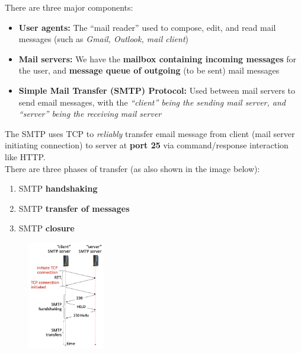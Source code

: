 \documentclass[12pt,a4paper]{article}
\begin{document}

\noindent There are three major components: \\

\begin{itemize}
  \item \textbf{User agents:} The ``mail reader'' used to compose, edit, and read mail messages (such as \textit{Gmail, Outlook, mail client})
  \item \textbf{Mail servers:} We have the \textbf{mailbox containing incoming messages} for the user, and \textbf{message queue of outgoing} (to be sent) mail messages
  \item \textbf{Simple Mail Transfer (SMTP) Protocol:} Used between mail servers to send email messages, with the \textit{``client'' being the sending mail server, and ``server'' being the receiving mail server}
\end{itemize}

\noindent The SMTP uses TCP to \textit{reliably} transfer email message from client (mail server initiating connection) to server at \textbf{port 25} via command/response interaction like HTTP. \\

\noindent There are three phases of transfer (as also shown in the image below): \\

\vspace{-0.5em}\begin{enumerate}
  \item SMTP \textbf{handshaking}
  \item SMTP \textbf{transfer of messages}
  \item SMTP \textbf{closure}
\end{enumerate}

\vspace{-1.5em}\begin{figure}[h]
  \centering
  \includegraphics[width=0.3\textwidth]{ch2_img/smtp.png}
\end{figure}
\end{document}
